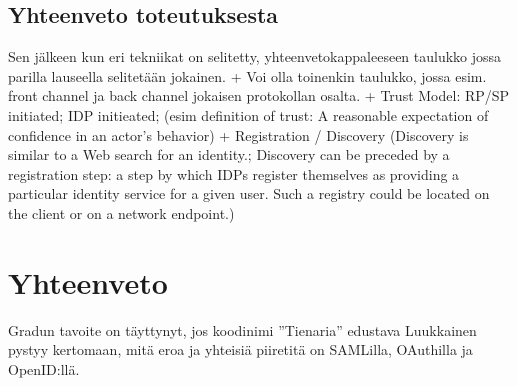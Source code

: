 \documentclass[finnish,gradu]{tktltiki}
\begin{document}




  \subsection{Yhteenveto toteutuksesta} %
  \label{sub:yhteenveto_toteutuksesta}

  Sen jälkeen kun eri tekniikat on selitetty, yhteenvetokappaleeseen taulukko jossa parilla lauseella selitetään jokainen.
  + Voi olla toinenkin taulukko, jossa esim. front channel ja back channel jokaisen protokollan osalta.
  + Trust Model: RP/SP initiated; IDP initieated; (esim definition of trust: A reasonable expectation of confidence in an actor’s behavior)
  + Registration / Discovery (Discovery is similar to a Web search for an identity.; Discovery can be preceded by a registration step: a step by which IDPs register themselves as providing a particular identity service for a given user. Such a registry could be located on the client or on a network endpoint.)






\section{Yhteenveto} %
\label{sec:yhteenveto}

  Gradun tavoite on täyttynyt, jos koodinimi ''Tienaria'' edustava Luukkainen pystyy kertomaan, mitä eroa ja yhteisiä piiretitä on SAMLilla, OAuthilla ja OpenID:llä.





\lastpage
\end{document}
